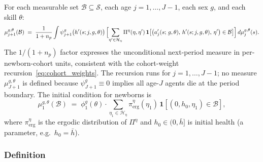 \documentclass[12pt,a4paper]{article}
\begin{document}
For each measurable set $\mathcal{B} \subseteq \mathcal{S}$, each age $j = 1, \ldots, J-1$, each sex $g$, and each skill $\theta$:
\begin{equation}
\label{eq:lom}
\mu_{j+1}^{g,\theta}(\mathcal{B})
\;=\;
\frac{1}{1 + n_p}
\int
\psi_{j+1}^{g}\bigl(h'(s; j, g, \theta)\bigr)\,
\Bigl[\sum_{\eta' \in \mathcal{H}_\eta}
\Pi^\eta(\eta, \eta')\,
\mathbf{1}\bigl[\bigl(a_j'(s;\, g, \theta),\, h'(s; j, g, \theta),\, \eta'\bigr) \in \mathcal{B}\bigr]
\Bigr]
\, d\mu_j^{g,\theta}(s).
\end{equation}
The $1/(1+n_p)$ factor expresses the unconditional next-period measure in per-newborn-cohort units, consistent with the cohort-weight recursion~\eqref{eq:cohort_weights}. The recursion runs for $j = 1, \ldots, J-1$; no measure $\mu^{g,\theta}_{J+1}$ is defined because $\psi^{g}_{J+1} \equiv 0$ implies all age-$J$ agents die at the period boundary. The initial condition for newborns is
\begin{equation}
\label{eq:initial_dist}
\mu_1^{g,\theta}(\mathcal{B})
\;=\;
\phi_{1}^{g}(\theta) \cdot
\sum_{\eta_1 \in \mathcal{H}_\eta} \pi^\eta_{\mathrm{erg}}(\eta_1)\,
\mathbf{1}[(0, h_0, \eta_1) \in \mathcal{B}],
\end{equation}
where $\pi^\eta_{\mathrm{erg}}$ is the ergodic distribution of $\Pi^\eta$ and $h_0 \in (0, \bar h]$ is initial health (a parameter, e.g.\ $h_0 = \bar h$).

\subsubsection{Definition}
 
\end{document}
